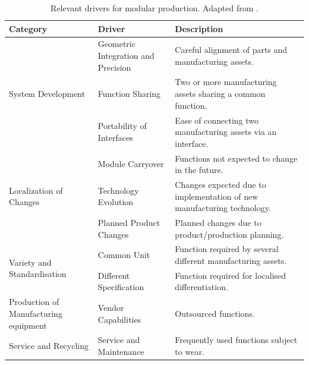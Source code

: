 \begin{table}
	\centering
	\caption[Relevant drivers for modular production.]
	{Relevant drivers for modular production.
	Adapted from \parencite{DitlevModDrivers}.}\label{tab:modularDrivers}
	\small
	\begin{tabular}{p{}p{}p{}}
		\toprule
		Category & Driver & Description\\
		\midrule
		\multirow{3}{.2\textwidth}{System Development} & Geometric Integration and Precision & Careful alignment of parts and manufacturing assets.\\
		& Function Sharing & Two or more manufacturing assets sharing a common function.\\
		& Portability of Interfaces & Ease of connecting two manufacturing assets via an interface.\\
		\midrule
		\multirow{3}{.2\textwidth}{Localization of Changes} & Module Carryover & Functions not expected to change in the future.\\
		& Technology Evolution & Changes expected due to implementation of new manufacturing technology.\\
		& Planned Product Changes & Planned changes due to product/production planning.\\
		\midrule
		\multirow{2}{.2\textwidth}{Variety and Standardisation} & Common Unit & Function required by several different manufacturing assets.\\
		& Different Specification & Function required for localised differentiation.\\
		\midrule
		Production of Manufacturing equipment & Vendor Capabilities & Outsourced functions.\\
		\midrule
		Service and Recycling & Service and Maintenance & Frequently used functions subject to wear.\\
		\bottomrule
	\end{tabular}
\end{table}


